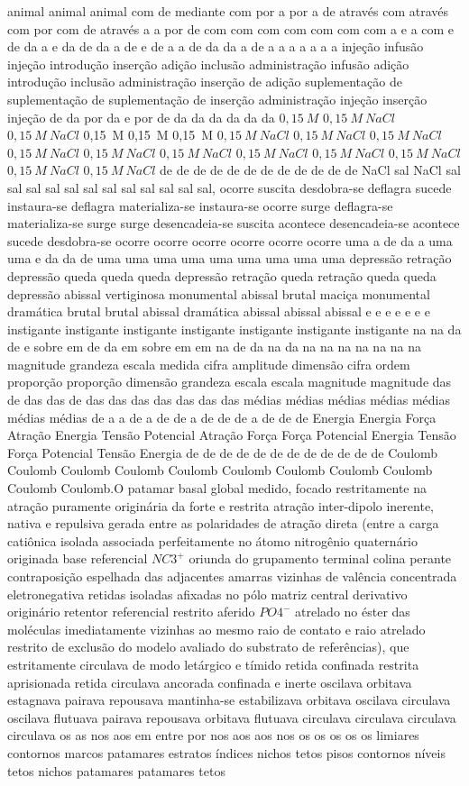 animal animal animal com de mediante com por a por a de através com através com por com de através a a por de com com com com com com com a e a com e de da a e da de da a de e de a a de da da a de a a a a a a a injeção infusão injeção introdução inserção adição inclusão administração infusão adição introdução inclusão administração inserção de adição suplementação de suplementação de suplementação de inserção administração injeção inserção injeção de da por da e por de da da da da da da $0,15~M$ $0,15~M~NaCl$ $0,15~M~NaCl$ 0,15~M 0,15~M 0,15~M $0,15~M~NaCl$ $0,15~M~NaCl$ $0,15~M~NaCl$ $0,15~M~NaCl$ $0,15~M~NaCl$ $0,15~M~NaCl$ $0,15~M~NaCl$ $0,15~M~NaCl$ $0,15~M~NaCl$ $0,15~M~NaCl$ $0,15~M~NaCl$ de de de de de de de de de de de de NaCl sal NaCl sal sal sal sal sal sal sal sal sal sal sal sal, ocorre suscita desdobra-se deflagra sucede instaura-se deflagra materializa-se instaura-se ocorre surge deflagra-se materializa-se surge surge desencadeia-se suscita acontece desencadeia-se acontece sucede desdobra-se ocorre ocorre ocorre ocorre ocorre ocorre uma a de da a uma uma e da da de uma uma uma uma uma uma uma uma uma depressão retração depressão queda queda queda depressão retração queda retração queda queda depressão abissal vertiginosa monumental abissal brutal maciça monumental dramática brutal brutal abissal dramática abissal abissal abissal e e e e e e e instigante instigante instigante instigante instigante instigante instigante na na da de e sobre em de da em sobre em em na de da na da na na na na na na na magnitude grandeza escala medida cifra amplitude dimensão cifra ordem proporção proporção dimensão grandeza escala escala magnitude magnitude das de das das de das das das das das das das médias médias médias médias médias médias médias de a a de a de de a de de de a de de de Energia Energia Força Atração Energia Tensão Potencial Atração Força Força Potencial Energia Tensão Força Potencial Tensão Energia de de de de de de de de de de de de Coulomb Coulomb Coulomb Coulomb Coulomb Coulomb Coulomb Coulomb Coulomb Coulomb Coulomb.O patamar basal global medido, focado restritamente na atração puramente originária da forte e restrita atração inter-dipolo inerente, nativa e repulsiva gerada entre as polaridades de atração direta (entre a carga catiônica isolada associada perfeitamente no átomo nitrogênio quaternário originada base referencial $NC3^{+}$ oriunda do grupamento terminal colina perante contraposição espelhada das adjacentes amarras vizinhas de valência concentrada eletronegativa retidas isoladas afixadas no pólo matriz central derivativo originário retentor referencial restrito aferido $PO4^{-}$ atrelado no éster das moléculas imediatamente vizinhas ao mesmo raio de contato e raio atrelado restrito de exclusão do modelo avaliado do substrato de referências), que estritamente circulava de modo letárgico e tímido retida confinada restrita aprisionada retida circulava ancorada confinada e inerte oscilava orbitava estagnava pairava repousava mantinha-se estabilizava orbitava oscilava circulava oscilava flutuava pairava repousava orbitava flutuava circulava circulava circulava circulava os as nos aos em entre por nos aos aos nos os os os os os limiares contornos marcos patamares estratos índices nichos tetos pisos contornos níveis tetos nichos patamares patamares tetos 